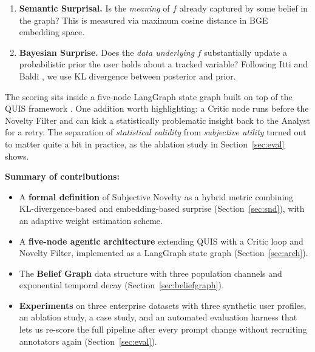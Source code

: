 \documentclass[conference]{IEEEtran}
\begin{document}
\begin{enumerate}
    \item \textbf{Semantic Surprisal.} Is the \emph{meaning} of $f$
    already captured by some belief in the graph? This is measured via
    maximum cosine distance in BGE embedding space.

    \item \textbf{Bayesian Surprise.} Does the \emph{data underlying}
    $f$ substantially update a probabilistic prior the user holds about
    a tracked variable? Following Itti and Baldi \cite{itti2009bayesian},
    we use KL divergence between posterior and prior.
\end{enumerate}

The scoring sits inside a five-node LangGraph \cite{langgraph} state
graph built on top of the QUIS framework \cite{quis2024emnlp}. One
addition worth highlighting: a Critic node runs before the Novelty
Filter and can kick a statistically problematic insight back to the
Analyst for a retry. The separation of \emph{statistical validity}
from \emph{subjective utility} turned out to matter quite a bit in
practice, as the ablation study in Section~\ref{sec:eval} shows.

\textbf{Summary of contributions:}
\begin{itemize}
    \item A \textbf{formal definition} of Subjective Novelty as a
    hybrid metric combining KL-divergence-based and embedding-based
    surprise (Section~\ref{sec:snd}), with an adaptive weight
    estimation scheme.

    \item A \textbf{five-node agentic architecture} extending QUIS
    with a Critic loop and Novelty Filter, implemented as a LangGraph
    state graph (Section~\ref{sec:arch}).

    \item The \textbf{Belief Graph} data structure with three
    population channels and exponential temporal decay
    (Section~\ref{sec:beliefgraph}).

    \item \textbf{Experiments} on three enterprise datasets with
    three synthetic user profiles, an ablation study, a case study,
    and an automated evaluation harness that lets us re-score the
    full pipeline after every prompt change without recruiting
    annotators again (Section~\ref{sec:eval}).
\end{itemize}

\end{document}
